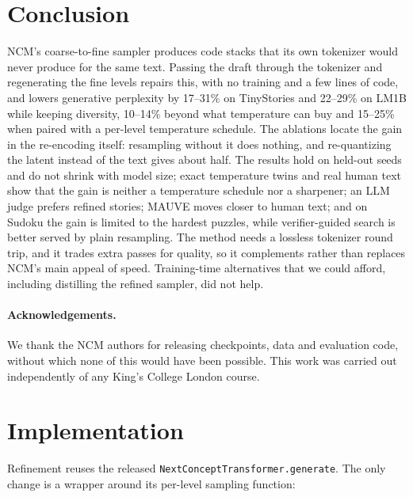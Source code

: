\documentclass[10pt]{article}
\begin{document}
\section{Conclusion}

NCM's coarse-to-fine sampler produces code stacks that its own tokenizer would never produce for the same text. Passing the draft through the tokenizer and regenerating the fine levels repairs this, with no training and a few lines of code, and lowers generative perplexity by 17--31\% on TinyStories and 22--29\% on LM1B while keeping diversity, 10--14\% beyond what temperature can buy and 15--25\% when paired with a per-level temperature schedule. The ablations locate the gain in the re-encoding itself: resampling without it does nothing, and re-quantizing the latent instead of the text gives about half. The results hold on held-out seeds and do not shrink with model size; exact temperature twins and real human text show that the gain is neither a temperature schedule nor a sharpener; an LLM judge prefers refined stories; MAUVE moves closer to human text; and on Sudoku the gain is limited to the hardest puzzles, while verifier-guided search is better served by plain resampling. The method needs a lossless tokenizer round trip, and it trades extra passes for quality, so it complements rather than replaces NCM's main appeal of speed. Training-time alternatives that we could afford, including distilling the refined sampler, did not help.

\paragraph{Acknowledgements.} We thank the NCM authors for releasing checkpoints, data and evaluation code, without which none of this would have been possible. This work was carried out independently of any King's College London course.

\clearpage



\appendix

\section{Implementation}
\label{app:impl}

Refinement reuses the released \texttt{NextConceptTransformer.generate}. The only change is a wrapper around its per-level sampling function:
\end{document}
